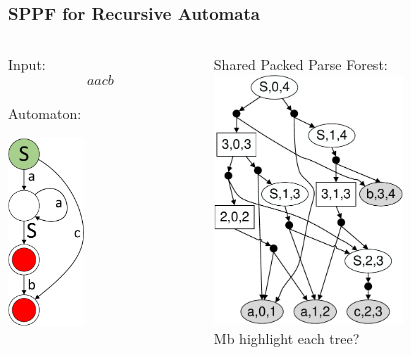 \documentclass{beamer}
\begin{document}
	\begin{frame} 
		\frametitle{SPPF for Recursive Automata}
		\begin{columns}
			\begin{column}{5cm}
				Input: $$aacb$$ \\
				\vspace{10pt}
				Automaton: \\
				\vspace{5pt}
				\begin{center}
					\includegraphics[width=2cm]{pictures/G0minimizedAutomaton.pdf}
				\end{center}
			\end{column}
			\begin{column}{6cm}
				Shared Packed Parse Forest: \\
				\vspace{10pt}
				\includegraphics[width=5cm]{pictures/G0SPPF.pdf}
				\\
				Mb highlight each tree?
			\end{column}
		\end{columns}

	\end{frame}
	
\end{document}
